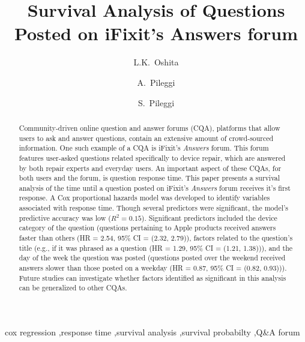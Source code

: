 \documentclass[preprint]{elsarticle}\usepackage[]{graphicx}\usepackage[]{color}
\begin{document}
\makeatletter
\DeclareRobustCommand\bfseries{%
  \not@math@alphabet\bfseries\mathbf
  \fontseries\bfdefault\selectfont
  \boldmath %
}
\makeatother




\begin{frontmatter}
\title{Survival Analysis of Questions Posted on iFixit's Answers forum}

\author[cp]{L.K.~Oshita}

\author[ifixit]{A.~Pileggi}
\author[cp]{S.~Pileggi}

\address[cp]{California Polytechnic State University, San Luis Obispo, CA 93407, United States}
\address[ifixit]{iFixit, 1330 Monterey St, San Luis Obispo, CA 93401, United States}

\begin{abstract} 
Community-driven online question and answer forums (CQA), platforms that allow users to ask and answer questions, contain an extensive amount of crowd-sourced information. One such example of a CQA is iFixit's \textit{Answers} forum. This forum features user-asked questions related specifically to device repair, which are answered by both repair experts and everyday users. An important aspect of these CQAs, for both users and the forum, is question response time. This paper presents a survival analysis of the time until a question posted on iFixit's \textit{Answers} forum receives it's first response. A Cox proportional hazards model was developed to identify variables associated with response time. Though several predictors were significant, the model's predictive accuracy was low ($R^2 = 0.15$). Significant predictors included the device category of the question (questions pertaining to Apple products received answers faster than others (HR = 2.54, 95\% CI = (2.32, 2.79)), factors related to the question's title (e.g., if it was phrased as a question (HR = 1.29, 95\% CI = (1.21, 1.38))), and the day of the week the question was posted (questions posted over the weekend received answers slower than those posted on a weekday (HR = 0.87, 95\% CI = (0.82, 0.93))). Future studies can investigate whether factors identified as significant in this analysis can be generalized to other CQAs.
\end{abstract}

\begin{keyword}
cox regression \sep response time \sep survival analysis \sep survival probabilty \sep Q\&A forum 
\end{keyword}

\end{frontmatter}
\end{document}
